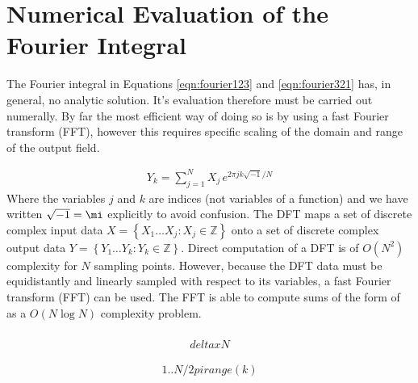 \section{Numerical Evaluation of the Fourier Integral}

The Fourier integral in Equations \ref{eqn:fourier123} and
\ref{eqn:fourier321} has, in general, no analytic solution.  It's
evaluation therefore must be carried out numerally.  By far the most
efficient way of doing so is by using a fast Fourier transform (FFT),
however this requires specific scaling of the domain and range of the
output field.

\begin{align}
Y_k = \sum_{j=1}^{N} X_j\, e^{2\pi j k\sqrt{-1}/N}
\label{eqn:dft}
\end{align}
Where the variables $j$ and $k$ are indices (not variables of a function)
and we have written $\sqrt{-1}=\mi$ explicitly to avoid confusion.
The DFT maps a set of discrete complex input data
$X = \left\{X_1\dots X_j : X_j\in\mathbb{Z}\right\}$ onto a set of
discrete complex output data $Y =
\left\{Y_1\dots Y_k : Y_k\in\mathbb{Z}\right\}$.  
Direct computation of a DFT is of $O(N^2)$ complexity for $N$ sampling
points.  However, because the DFT data must be equidistantly and linearly
sampled with respect to its variables, a fast Fourier transform (FFT) can
be used. The FFT is able to compute sums of the form of 
as a $O(N \log N)$ complexity problem. 
\begin{align}

\end{align}

\begin{align}
deltax N
\end{align}

\begin{align}
1..N / 2 pi range(k)
\end{align}


